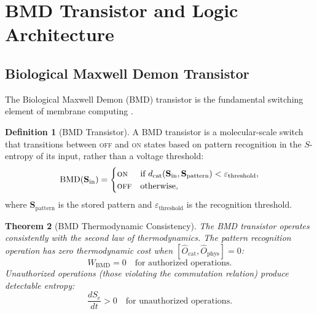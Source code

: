 \documentclass[twocolumn,10pt]{article}
\newtheorem{theorem}{Theorem}[section]
\theoremstyle{definition}
\newtheorem{definition}[theorem]{Definition}
\theoremstyle{remark}
\newcommand{\Se}{S_e}
\newcommand{\Ocat}{\hat{O}_{\mathrm{cat}}}
\newcommand{\Ophys}{\hat{O}_{\mathrm{phys}}}
\begin{document}
\section{BMD Transistor and Logic Architecture}
\label{sec:bmd}

\subsection{Biological Maxwell Demon Transistor}

The Biological Maxwell Demon (BMD) transistor is the fundamental switching element of membrane computing \cite{sachikonye2025circuits, szilard1929entropieverminderung, leff1990maxwell}.

\begin{definition}[BMD Transistor]
\label{def:bmd}
A BMD transistor is a molecular-scale switch that transitions between \textsc{off} and \textsc{on} states based on pattern recognition in the $S$-entropy of its input, rather than a voltage threshold:
\begin{equation}
  \mathrm{BMD}(\mathbf{S}_{\mathrm{in}}) =
  \begin{cases}
    \textsc{on} & \text{if } d_{\mathrm{cat}}(\mathbf{S}_{\mathrm{in}}, \mathbf{S}_{\mathrm{pattern}}) < \varepsilon_{\mathrm{threshold}}, \\
    \textsc{off} & \text{otherwise},
  \end{cases}
  \label{eq:bmd}
\end{equation}
where $\mathbf{S}_{\mathrm{pattern}}$ is the stored pattern and $\varepsilon_{\mathrm{threshold}}$ is the recognition threshold.
\end{definition}

\begin{theorem}[BMD Thermodynamic Consistency]
\label{thm:bmd_thermo}
The BMD transistor operates consistently with the second law of thermodynamics. The pattern recognition operation has zero thermodynamic cost when $[\Ocat, \Ophys] = 0$:
\begin{equation}
  W_{\mathrm{BMD}} = 0 \quad \text{for authorized operations}.
  \label{eq:bmd_work}
\end{equation}
Unauthorized operations (those violating the commutation relation) produce detectable entropy:
\begin{equation}
  \frac{d\Se}{dt} > 0 \quad \text{for unauthorized operations}.
  \label{eq:bmd_unauthorized}
\end{equation}
\end{theorem}
\end{document}
